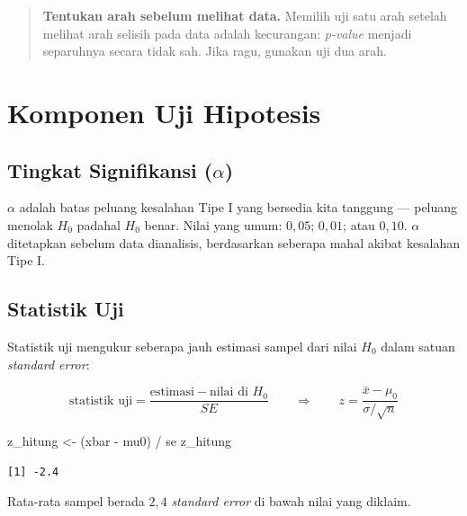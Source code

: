 \documentclass[
  indonesian,
  letterpaper,
]{book}
\newenvironment{Shaded}{\begin{snugshade}}{\end{snugshade}}
\newcommand{\NormalTok}[1]{\textcolor[rgb]{0.00,0.23,0.31}{#1}}
\newcommand{\OtherTok}[1]{\textcolor[rgb]{0.00,0.23,0.31}{#1}}
\newcommand{\SpecialCharTok}[1]{\textcolor[rgb]{0.37,0.37,0.37}{#1}}
\begin{document}
\begin{quote}
\textbf{Tentukan arah sebelum melihat data.} Memilih uji satu arah
setelah melihat arah selisih pada data adalah kecurangan: \emph{p-value}
menjadi separuhnya secara tidak sah. Jika ragu, gunakan uji dua arah.
\end{quote}

\section{Komponen Uji Hipotesis}\label{komponen-uji-hipotesis}

\subsection{\texorpdfstring{Tingkat Signifikansi
(\(\alpha\))}{Tingkat Signifikansi (\textbackslash alpha)}}\label{tingkat-signifikansi-alpha}

\(\alpha\) adalah batas peluang kesalahan Tipe I yang bersedia kita
tanggung --- peluang menolak \(H_0\) padahal \(H_0\) benar. Nilai yang
umum: \(0{,}05\); \(0{,}01\); atau \(0{,}10\). \(\alpha\) ditetapkan
sebelum data dianalisis, berdasarkan seberapa mahal akibat kesalahan
Tipe I.

\subsection{Statistik Uji}\label{statistik-uji}

Statistik uji mengukur seberapa jauh estimasi sampel dari nilai \(H_0\)
dalam satuan \emph{standard error}:

\[\text{statistik uji} = \frac{\text{estimasi} - \text{nilai di } H_0}{SE} \qquad \Longrightarrow \qquad z = \frac{\bar{x} - \mu_0}{\sigma / \sqrt{n}}\]

\begin{Shaded}
\begin{Highlighting}[]
\NormalTok{z\_hitung }\OtherTok{\textless{}{-}}\NormalTok{ (xbar }\SpecialCharTok{{-}}\NormalTok{ mu0) }\SpecialCharTok{/}\NormalTok{ se}
\NormalTok{z\_hitung}
\end{Highlighting}
\end{Shaded}

\begin{verbatim}
[1] -2.4
\end{verbatim}

Rata-rata sampel berada \(2{,}4\) \emph{standard error} di bawah nilai
yang diklaim.
\end{document}
